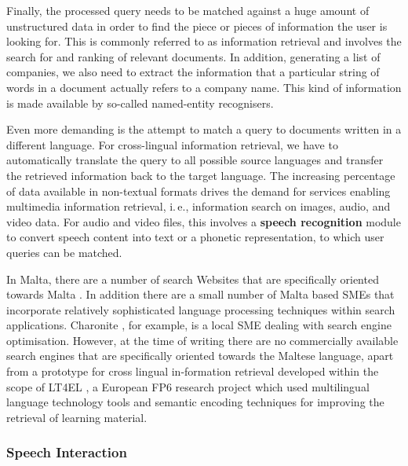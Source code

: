 \begin{multicols}{2}
Finally, the processed query needs to be matched against a huge amount of unstructured data in order to find the piece or pieces of information the user is looking for. This is commonly referred to as information retrieval and involves the search for and ranking of relevant documents. In addition, generating a list of companies, we also need to extract the information that a particular string of words in a document actually refers to a company name. This kind of information is made available by so-called named-entity recognisers. 


Even more demanding is the attempt to match a query to documents written in a different language. For cross-lingual information retrieval, we have to automatically translate the query to all possible source languages and transfer the retrieved information back to the target language. The increasing percentage of data available in non-textual formats drives the demand for services enabling multimedia information retrieval, i.\,e., information search on images, audio, and video data. For audio and video files, this involves a \textbf{speech recognition} module to convert speech content into text or a phonetic representation, to which user queries can be matched.

In Malta, there are a number of search Websites that are specifically oriented towards Malta \cite{philb1}. In addition there are a small number of Malta based SMEs that incorporate relatively sophisticated language processing techniques within search applications. Charonite \cite{charonite1}, for example, is a local SME dealing with search engine optimisation. However, at the time of writing there are no commercially available search engines that are specifically oriented towards the Maltese language, apart from a prototype for cross lingual in-formation retrieval developed within the scope of LT4EL \cite{let1}, a European FP6 research project which used multilingual language technology tools and semantic encoding techniques for improving the retrieval of learning material. 

\subsubsection{Speech Interaction}


\end{multicols}
